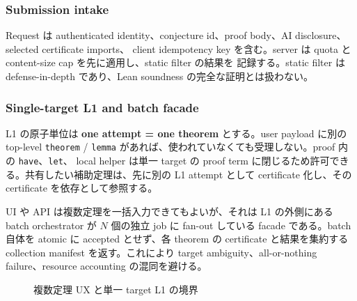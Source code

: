 \documentclass[a4paper,11pt]{ltjsarticle}
\newcommand{\term}[1]{\textbf{\color{TFNavy}#1}}
\begin{document}
\subsubsection{Submission intake}

Request は authenticated identity、conjecture id、proof body、AI disclosure、selected certificate imports、
client idempotency key を含む。server は quota と content-size cap を先に適用し、static filter の結果を
記録する。static filter は defense-in-depth であり、Lean soundness の完全な証明とは扱わない。

\subsubsection{Single-target L1 and batch facade}

L1 の原子単位は \term{one attempt = one theorem} とする。user payload に別の top-level
\texttt{theorem} / \texttt{lemma} があれば、使われていなくても受理しない。proof 内の \texttt{have}、\texttt{let}、
local helper は単一 target の proof term に閉じるため許可できる。共有したい補助定理は、先に別の L1 attempt として
certificate 化し、その certificate を依存として参照する。

UI や API は複数定理を一括入力できてもよいが、それは L1 の外側にある batch orchestrator が $N$ 個の独立 job に
fan-out している facade である。batch 自体を atomic に accepted とせず、各 theorem の certificate と結果を集約する
collection manifest を返す。これにより target ambiguity、all-or-nothing failure、resource accounting の混同を避ける。

\begin{figure}[htbp]
\centering
{}
\caption{複数定理 UX と単一 target L1 の境界}
\end{figure}
\FloatBarrier
\end{document}
